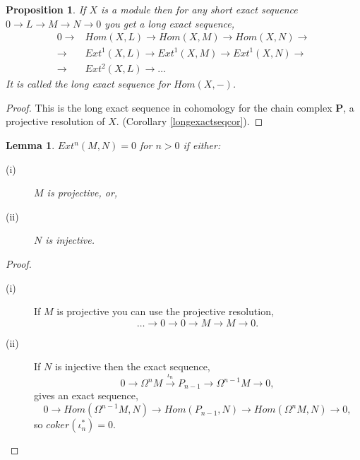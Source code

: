 \documentclass[11.5pt, twoside, a4paper, titlepage]{report}
\theoremstyle{definition}
\theoremstyle{plain}
\newtheorem{lem}[mydef]{Lemma}
\newtheorem{prop}[mydef]{Proposition}
\begin{document}
\begin{prop} \label{longexactHom(X,-)prop}
If $X$ is a module then for any short exact sequence $0\xrightarrow{}L\xrightarrow{}M\xrightarrow{}N\xrightarrow{}0$ you get a long exact sequence, 
\begin{align*}
0 \xrightarrow{}& Hom(X,L) \xrightarrow{} Hom(X, M) \xrightarrow{} Hom(X, N) \xrightarrow{} \\
\xrightarrow{} & Ext^1(X,L) \xrightarrow{} Ext^1(X,M) \xrightarrow{} Ext^1(X,N) \xrightarrow{}\\
\xrightarrow{} & Ext^2(X,L) \xrightarrow{} \dots
\end{align*}
It is called the long exact sequence for $Hom(X,-)$.
\end{prop}
\begin{proof}
This is the long exact sequence in cohomology for the chain complex $\mathbf{P}$, a projective resolution of $X$. (Corollary \ref{longexactseqcor}).
\end{proof}

\begin{lem} \label{Ext=0lem}
$Ext^n(M,N)=0$ for $n>0$ if either:
\begin{description}
\item [(i)] $M$ is projective, or, 
\item [(ii)] $N$ is injective.
\end{description}
\end{lem}
\begin{proof}
\begin{description}
\item [(i)] If $M$ is projective you can use the projective resolution,
\begin{equation*}
\dots \xrightarrow{} 0 \xrightarrow{} 0 \xrightarrow{} M \xrightarrow{} M \xrightarrow{} 0.
\end{equation*}
\item [(ii)] If $N$ is injective then the exact sequence,
\begin{equation*}
0\xrightarrow{} \Omega^nM \xrightarrow{\iota_n} P_{n-1} \xrightarrow{} \Omega^{n-1}M \xrightarrow{} 0,
\end{equation*}
gives an exact sequence, 
\begin{equation*}
0 \xrightarrow{} Hom(\Omega^{n-1}M, N) \xrightarrow{} Hom(P_{n-1}, N) \xrightarrow{} Hom(\Omega^nM, N) \xrightarrow{}0,
\end{equation*}
so $coker(\iota^{\ast}_n)=0$.
\end{description}
\end{proof}
\end{document}
